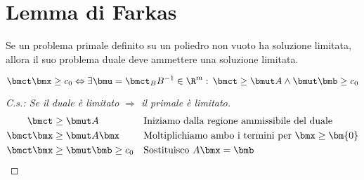 \documentclass[\main/main.tex]{subfiles}
\begin{document}
\section{Lemma di Farkas}

\begin{theorem}
  \label{lemma_farkas}
  Se un problema primale definito su un poliedro non vuoto ha soluzione limitata, allora il suo problema duale deve ammettere una soluzione limitata.

  \[
    \bmct \bmx \geq c_0 \Leftrightarrow \exists \bmu = \bmct_B B^{-1} \in \R^m:\, \bmct \geq \bmut A \land \bmut \bmb \geq c_0
  \]
\end{theorem}


\begin{proof}[C.s.: Se il duale è limitato $\Rightarrow$ il primale è limitato]
  \begin{align*}
    \bmct     & \geq \bmut A             &  & \text{Iniziamo dalla regione ammissibile del duale}         \\
    \bmct\bmx & \geq \bmut A\bmx         &  & \text{Moltiplichiamo ambo i termini per $\bmx \geq \bm{0}$} \\
    \bmct\bmx & \geq \bmut \bmb \geq c_0 &  & \text{Sostituisco $A\bmx = \bmb$}
  \end{align*}
\end{proof}
\end{document}
